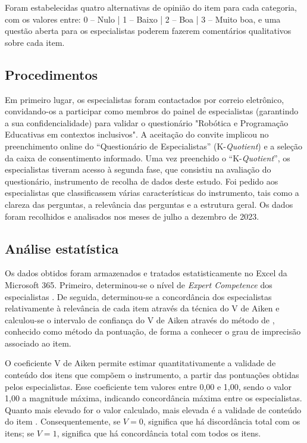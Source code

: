 \documentclass[portuguese]{textolivre}
\begin{document}
Foram estabelecidas quatro alternativas de opinião do item para cada categoria, com os valores entre: 0 – Nulo | 1 – Baixo | 2 – Boa | 3 – Muito boa, e uma questão aberta para os especialistas poderem fazerem comentários qualitativos sobre cada item.


\subsection{Procedimentos}\label{sec-formato}
Em primeiro lugar, os especialistas foram contactados por correio eletrônico, convidando-os a participar como membros do painel de especialistas (garantindo a sua confidencialidade) para validar o questionário "Robótica e Programação Educativas em contextos inclusivos". A aceitação do convite implicou no preenchimento online do “Questionário de Especialistas” (K-\textit{Quotient}) e a seleção da caixa de consentimento informado. Uma vez preenchido o “K-\textit{Quotient}”, os especialistas tiveram acesso à segunda fase, que consistiu na avaliação do questionário, instrumento de recolha de dados deste estudo. Foi pedido aos especialistas que classificassem várias características do instrumento, tais como a clareza das perguntas, a relevância das perguntas e a estrutura geral. Os dados foram recolhidos e analisados nos meses de julho a dezembro de 2023.


\subsection{Análise estatística}\label{sec-modelo}
Os dados obtidos foram armazenados e tratados estatisticamente no Excel da Microsoft 365. Primeiro, determinou-se o nível de \textit{Expert Competence} dos especialistas \cite{cabero_almenara_utilizacion_2013}. De seguida, determinou-se a concordância dos especialistas relativamente à relevância de cada item através da técnica do V de Aiken \cite{aiken_three_1985,merino-soto_coeficientes_2023} e calculou-se o intervalo de confiança do V de Aiken através do método de \textcite{wilson_probable_1927}, conhecido como método da pontuação, de forma a conhecer o grau de imprecisão associado ao item.

O coeficiente V de Aiken permite estimar quantitativamente a validade de conteúdo dos itens que compõem o instrumento, a partir das pontuações obtidas pelos especialistas. Esse coeficiente tem valores entre 0,00 e 1,00, sendo o valor 1,00 a magnitude máxima, indicando concordância máxima entre os especialistas. Quanto mais elevado for o valor calculado, mais elevada é a validade de conteúdo do item \cite{mayaute_cuantificacion_1988,pereira_escala_2023}. Consequentemente, se $V=0$, significa que há discordância total com os itens; se $V=1$, significa que há concordância total com todos os itens.
\end{document}

